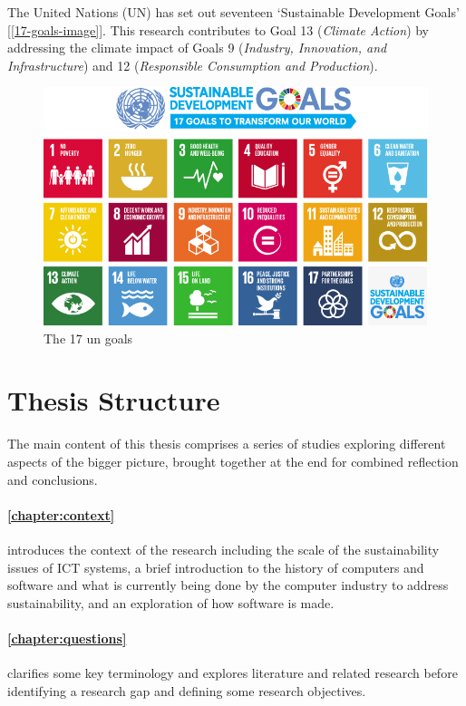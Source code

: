 The United Nations (UN) has set out seventeen `Sustainable Development Goals'  [\autoref{17-goals-image}]. This research contributes to Goal 13 (\emph{Climate Action}) by addressing the climate impact of Goals 9 (\emph{Industry, Innovation, and Infrastructure}) and 12 (\emph{Responsible Consumption and Production}).


\begin{figure}[ht!]
\centering
\includegraphics[width=\textwidth]{Figures/17goals.png}
\caption{\label{17-goals-image}The 17 \gls{un goals} \citep{UnitedNations2015}}
\end{figure}

\section{Thesis Structure}
\label{section:thesis structure}

The main content of this thesis comprises a series of studies exploring different aspects of the bigger picture, brought together at the end for combined reflection and conclusions.

\paragraph{\autoref{chapter:context}} introduces the context of the research including the scale of the sustainability issues of ICT systems, a brief introduction to the history of computers and software and what is currently being done by the computer industry to address sustainability, and an exploration of how software is made.

\paragraph{\autoref{chapter:questions}} clarifies some key terminology and explores literature and related research before identifying a research gap and defining some research objectives.

